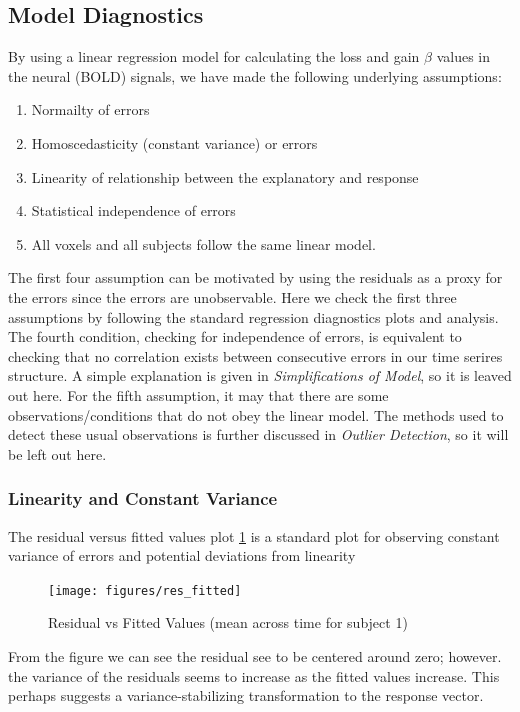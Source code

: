 \subsection{Model Diagnostics}
By using a linear regression model for calculating the loss and gain $\beta $ 
values in the neural (BOLD) signals, we have made the following underlying 
assumptions:
\begin{enumerate}
    \item Normailty of errors
    \item Homoscedasticity (constant variance) or errors  
    \item Linearity of relationship between the explanatory and response
    \item Statistical independence of errors   
    \item All voxels and all subjects follow the same linear model. 
\end{enumerate}
The first four assumption can be motivated by using the residuals as a proxy
for the errors since the errors are unobservable. Here we check the first 
three assumptions by following the standard regression diagnostics plots and 
analysis. The fourth condition, checking for independence of errors, is 
equivalent to checking that no correlation exists between consecutive errors 
in our time serires structure. A simple explanation is given in 
\textit{Simplifications of Model}, so it is leaved out here. For the fifth 
assumption, it may that there are some observations/conditions that do not 
obey the linear model. The methods used to detect these usual observations is 
further discussed in \textit{Outlier Detection}, so it will be left out here. 

\subsubsection{Linearity and Constant Variance}
The residual versus fitted values plot \ref{fig:residual_vs_fitted} is a 
standard plot for observing constant variance of errors and potential deviations
from linearity

\begin{figure}[ht]
\centering
\texttt{[image: figures/res\_fitted]}  
\caption{Residual vs Fitted Values (mean across time for subject 1)}
\label{fig:residual_vs_fitted}
\end{figure}

From the figure we can see the residual see to be centered around zero; however.
the variance of the residuals seems to increase as the fitted values increase. 
This perhaps suggests a variance-stabilizing transformation to the response 
vector.  

